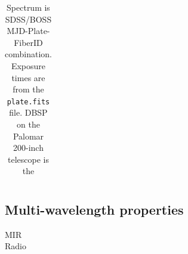\documentclass[a4paper,fleqn,usenatbib]{mnras}
\begin{document}
\begin{table}
\begin{tabular}{r  r  r r r   r r r r}
   \hline \hline   
  \end{tabular}
  \caption{Spectrum is SDSS/BOSS MJD-Plate-FiberID combination. 
Exposure times are from the {\tt plate.fits} file. 
DBSP on the Palomar 200-inch telescope is the } 
 \label{tab:obs_notes}
\end{table}

\subsection{Multi-wavelength properties}
MIR \\
Radio \\
\end{document}
